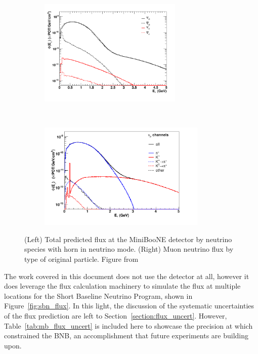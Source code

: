 \begin{figure}[tb]
  \centering

    \begin{subfigure}[t]{0.5\textwidth}
        \centering
        \includegraphics[height=2in]{beams_figures/mb_flux_nu}
    \end{subfigure}%
    ~ 
    \begin{subfigure}[t]{0.5\textwidth}
        \centering
        \includegraphics[height=2in]{beams_figures/mb_flux_by_type_nu}
    \end{subfigure}
  \caption[\MB Flux]{(Left) Total predicted flux at the MiniBooNE detector by neutrino species with horn in neutrino mode. (Right) Muon neutrino flux by type of original particle. Figure from  \cite{AguilarArevalo:2008yp}}
  \label{fig:mb_flux_nu}
\end{figure}

The work covered in this document does not use the \MB detector at all, however it does leverage the \MB flux calculation machinery to simulate the flux at multiple locations for the Short Baseline Neutrino Program, shown in Figure~\ref{fig:sbn_flux}.  In this light, the discussion of the systematic uncertainties of the flux prediction are left to Section~\ref{section:flux_uncert}.  However, Table~\ref{tab:mb_flux_uncert} is included here to showcase the precision at which \MB constrained the BNB, an accomplishment that future experiments are building upon.

